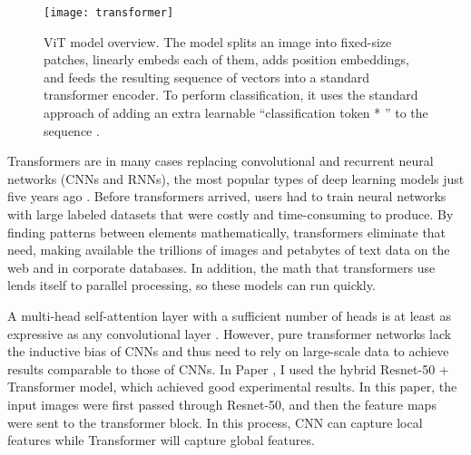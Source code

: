\begin{figure}[!h]
\centering
	\texttt{[image: transformer]}
		\caption{ViT model overview. The model splits an image into fixed-size patches, linearly embeds each of them, adds position embeddings, and feeds the resulting sequence of vectors into a standard transformer encoder. To perform classification, it uses the standard approach of adding an extra learnable “classification token * ” to the sequence \cite{dosovitskiy2020image}.}
		\label{Fig:trans} 
\end{figure}


Transformers are in many cases replacing convolutional and recurrent neural networks (CNNs and RNNs), the most popular types of deep learning models just five years ago \cite{whattran}. Before transformers arrived, users had to train neural networks with large labeled datasets that were costly and time-consuming to produce. By finding patterns between elements mathematically, transformers eliminate that need, making available the trillions of images and petabytes of text data on the web and in corporate databases. In addition, the math that transformers use lends itself to parallel processing, so these models can run quickly.

 A multi-head self-attention layer with a sufficient number of heads is at least as expressive as any convolutional layer \cite{cordonnier2019relationship}. However, pure transformer networks lack the inductive bias of CNNs and thus need to rely on large-scale data to achieve results comparable to those of CNNs. In Paper \uppercase\expandafter{}, I used the hybrid Resnet-50 + Transformer model, which achieved good experimental results. In this paper, the input images were first passed through Resnet-50, and then the feature maps were sent to the transformer block. In this process, CNN can capture local features while Transformer will capture global features.

 




